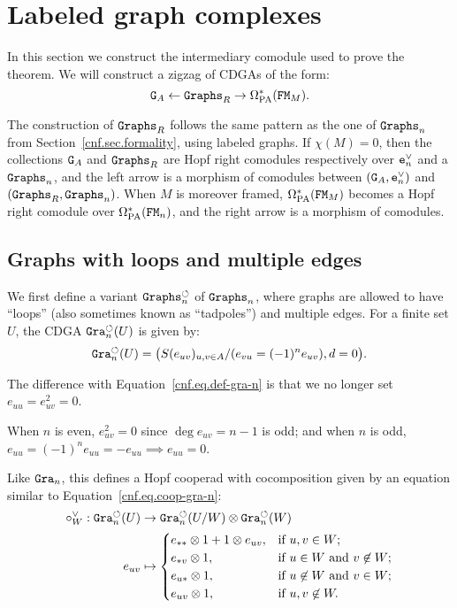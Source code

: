 \section{Labeled graph complexes}
\label{cnf.sec.label-graphs-stat}

In this section we construct the intermediary comodule used to prove the theorem.
We will construct a zigzag of CDGAs of the form:
\[ \mathtt{G}_{A} \gets \mathtt{Graphs}_{R} \to \Omega_{\mathrm{PA}}^{*}(\mathtt{FM}_{M}). \]

The construction of $\mathtt{Graphs}_{R}$ follows the same pattern as the one of $\mathtt{Graphs}_{n}$ from Section~\ref{cnf.sec.formality}, using labeled graphs.
If $\chi(M) = 0$, then the collections $\mathtt{G}_{A}$ and $\mathtt{Graphs}_{R}$ are Hopf right comodules respectively over $\mathtt{e}_{n}^{\vee}$ and a $\mathtt{Graphs}_{n}$, and the left arrow is a morphism of comodules between $(\mathtt{G}_{A}, \mathtt{e}_{n}^{\vee})$ and $(\mathtt{Graphs}_{R}, \mathtt{Graphs}_{n})$.
When $M$ is moreover framed, $\Omega_{\mathrm{PA}}^{*}(\mathtt{FM}_{M})$ becomes a Hopf right comodule over $\Omega_{\mathrm{PA}}^{*}(\mathtt{FM}_{n})$, and the right arrow is a morphism of comodules.

\subsection{Graphs with loops and multiple edges}
\label{cnf.sec.graphs-with-loops}

We first define a variant $\mathtt{Graphs}^{\circlearrowleft}_{n}$ of $\mathtt{Graphs}_{n}$, where graphs are allowed to have ``loops'' (also sometimes known as ``tadpoles'') and multiple edges.
For a finite set $U$, the CDGA $\mathtt{Gra}^{\circlearrowleft}_{n}(U)$ is given by:
\[ \mathtt{Gra}^{\circlearrowleft}_{n}(U) = \bigl( S(e_{uv})_{u, v \in A} / (e_{vu} = (-1)^{n} e_{uv}), d = 0 \bigr). \]

The difference with Equation~\eqref{cnf.eq.def-gra-n} is that we no longer set $e_{uu} = e_{uv}^{2} = 0$.

\begin{remark}
  When $n$ is even, $e_{uv}^{2} = 0$ since $\deg e_{uv} = n-1$ is odd; and when $n$ is odd, $e_{uu} = (-1)^{n} e_{uu} = -e_{uu} \implies e_{uu} = 0$.
\end{remark}

Like $\mathtt{Gra}_{n}$, this defines a Hopf cooperad with cocomposition given by an equation similar to Equation~\eqref{cnf.eq.coop-gra-n}:
\begin{align}
  \circ^{\vee}_{W} : \mathtt{Gra}_{n}^{\circlearrowleft}(U)
  & \to \mathtt{Gra}_{n}^{\circlearrowleft}(U/W) \otimes \mathtt{Gra}_{n}^{\circlearrowleft}(W)
  \nonumber \\
  e_{uv}
  & \mapsto
  \begin{cases}
    e_{**} \otimes 1 + 1 \otimes e_{uv}, & \text{if } u,v \in W; \\
    e_{*v} \otimes 1, & \text{if } u \in W \text{ and } v \not\in W; \\
    e_{u*} \otimes 1, & \text{if } u \not\in W \text{ and } v \in W; \\
    e_{uv} \otimes 1, & \text{if } u, v \not\in W.
  \end{cases}
\end{align}

